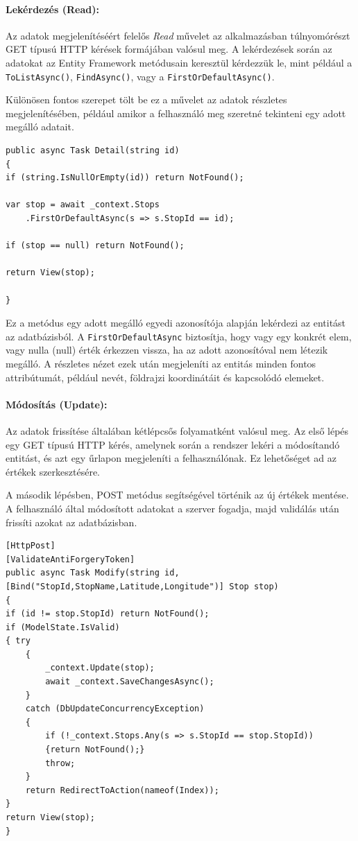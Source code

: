 \paragraph{Lekérdezés (Read):}
Az adatok megjelenítéséért felelős \textit{Read} művelet az alkalmazásban túlnyomórészt GET típusú HTTP kérések formájában valósul meg. A lekérdezések során az adatokat az Entity Framework metódusain keresztül kérdezzük le, mint például a \texttt{ToListAsync()}, \texttt{FindAsync()}, vagy a \texttt{FirstOrDefaultAsync()}.

Különösen fontos szerepet tölt be ez a művelet az adatok részletes megjelenítésében, például amikor a felhasználó meg szeretné tekinteni egy adott megálló adatait.

\begin{lstlisting}
public async Task Detail(string id)
{
if (string.IsNullOrEmpty(id)) return NotFound();

var stop = await _context.Stops
    .FirstOrDefaultAsync(s => s.StopId == id);

if (stop == null) return NotFound();

return View(stop);

}
\end{lstlisting}

Ez a metódus egy adott megálló egyedi azonosítója alapján lekérdezi az entitást az adatbázisból. A \texttt{FirstOrDefaultAsync} biztosítja, hogy vagy egy konkrét elem, vagy nulla (null) érték érkezzen vissza, ha az adott azonosítóval nem létezik megálló. A részletes nézet ezek után megjeleníti az entitás minden fontos attribútumát, például nevét, földrajzi koordinátáit és kapcsolódó elemeket.


\paragraph{Módosítás (Update):}
Az adatok frissítése általában kétlépcsős folyamatként valósul meg. Az első lépés egy GET típusú HTTP kérés, amelynek során a rendszer lekéri a módosítandó entitást, és azt egy űrlapon megjeleníti a felhasználónak. Ez lehetőséget ad az értékek szerkesztésére.

A második lépésben, POST metódus segítségével történik az új értékek mentése. A felhasználó által módosított adatokat a szerver fogadja, majd validálás után frissíti azokat az adatbázisban.

\begin{lstlisting}
[HttpPost]
[ValidateAntiForgeryToken]
public async Task Modify(string id,
[Bind("StopId,StopName,Latitude,Longitude")] Stop stop)
{
if (id != stop.StopId) return NotFound();
if (ModelState.IsValid)
{ try
    {
        _context.Update(stop);
        await _context.SaveChangesAsync();
    }
    catch (DbUpdateConcurrencyException)
    {
        if (!_context.Stops.Any(s => s.StopId == stop.StopId))
        {return NotFound();}
        throw;
    }
    return RedirectToAction(nameof(Index));
}
return View(stop);
}
\end{lstlisting}

